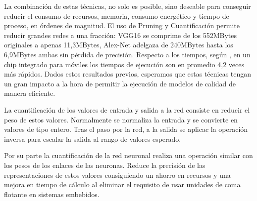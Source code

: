 
  La combinación de estas técnicas, no solo es posible, sino deseable para conseguir reducir el consumo de recursos, memoria, consumo energético y tiempo de proceso, en órdenes de magnitud. El uso de Pruning y Cuantificación permite reducir grandes redes a una fracción: VGG16 se comprime de los 552MBytes originales a apenas 11,3MBytes, Alex-Net adelgaza de 240MBytes hasta los 6,9MBytes ambas sin pérdida de precisión\cite{Han2015}. Respecto a los tiempos, según \citeauthor{Han2015}, en un chip integrado para móviles los tiempos de ejecución son en promedio 4,2 veces más rápidos. Dados estos resultados previos, esperamos que estas técnicas tengan un gran impacto a la hora de permitir la ejecución de modelos de calidad de manera eficiente.














La cuantificación de los valores de entrada y salida a la red consiste en reducir el peso de estos valores. Normalmente se normaliza la entrada y se convierte en valores de tipo entero. Tras el paso por la red, a la salida se aplicac la operación inversa para escalar la salida al rango de valores esperado.

Por su parte la cuantificación de la red neuronal realiza una operación similar con los pesos de los enlaces de las neuronas. Reduce la precisión de las representaciones de estos valores consiguiendo un ahorro en recursos y una mejora en tiempo de cálculo al eliminar el requisito de usar unidades de coma flotante en sistemas embebidos.




% 

